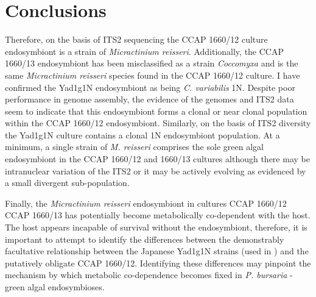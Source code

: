 \section{Conclusions}

Therefore, on the basis of ITS2 sequencing the CCAP 1660/12 culture endosymbiont is
a strain of \textit{Micractinium reisseri}.  Additionally, the CCAP 1660/13
endosymbiont has been misclassified as a strain \textit{Coccomyxa} and
is the same \textit{Micractinium reisseri} species found in the CCAP 1660/12 
culture. I have confirmed the Yad1g1N endosymbiont as being \textit{C. variabilis}
1N.  Despite poor performance in genome assembly, the evidence of
the genomes and ITS2 data seem to indicate that this endosymbiont
forms a clonal or near clonal population within the CCAP 1660/12
endosymbiont.  Similarly, on the basis of ITS2 diversity the Yad1g1N culture
contains a clonal 1N endosymbiont population.
At a minimum, a single strain of \textit{M. reisseri} 
comprises the sole green algal endosymbiont in the CCAP 1660/12
and 1660/13 cultures although there may be intranuclear variation of the ITS2
or it may be actively evolving as evidenced
by a small divergent sub-population.

Finally, the \textit{Micractinium reisseri} endosymbiont in cultures CCAP 1660/12 
CCAP 1660/13 has potentially become metabolically co-dependent with the host.
The host appears incapable of survival without the endosymbiont, therefore,
it is important to attempt to identify the differences between the demonstrably
facultative relationship between the Japanese Yad1g1N strains (used in \citep{Kodama2014c}) 
and the putatively obligate CCAP 1660/12. Identifying these differences may pinpoint
the mechanism by which metabolic co-dependence becomes fixed in \textit{P. bursaria}
- green algal endosymbioses.

